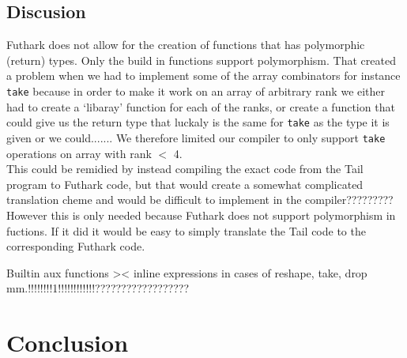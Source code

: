 \documentclass[11pt]{article}
\begin{document}
\subsection{Discusion}
Futhark does not allow for the creation of functions that has polymorphic (return) types. Only the build in functions support polymorphism. That created a problem when we had to implement some of the array combinators for instance  \verb|take| because in order to make it work on an array of arbitrary rank we either had to create a `libaray' function for each of the ranks, or create a function that could give us the return type that luckaly is the same for \verb|take| as the type it is given or we could....... 
We therefore limited our compiler to only support \verb|take| operations on array with rank \(< \) 4. \\ %

This could be remidied by instead compiling the exact code from the Tail program to Futhark code, but that would create a somewhat complicated translation cheme and would be difficult to implement in the compiler????????? %
However this is only needed because Futhark does not support polymorphism in fuctions. If it did it would be easy to simply translate the Tail code to the corresponding Futhark code.

Builtin aux functions >< inline expressions in cases of reshape, take, drop mm.!!!!!!!!1!!!!!!!!!!!!??????????????????

\section{Conclusion}



\end{document}
